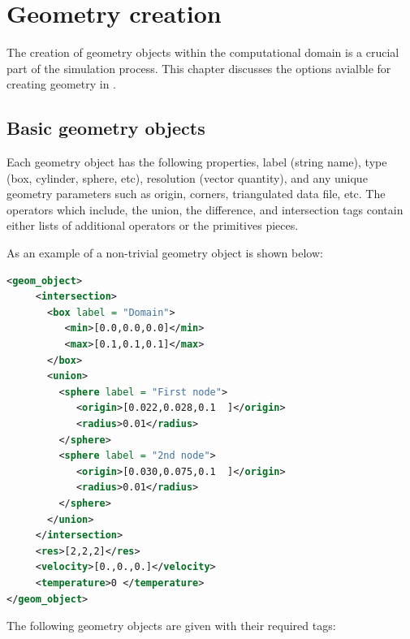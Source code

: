 \chapter{Geometry creation}\label{chap:GeometryCreation}
The creation of geometry objects within the computational domain is
a crucial part of the simulation process.  This chapter discusses the
options avialble for creating geometry in \Vaango.

\section{Basic geometry objects} \label{Sec:GeometryObjects}

Each geometry object has the following properties, label (string
name), type (box, cylinder, sphere, etc), resolution (vector
quantity), and any unique geometry parameters such as origin, corners,
triangulated data file, etc.  The operators which include, the union,
the difference, and intersection tags contain either lists of
additional operators or the primitives pieces.

As an example of a non-trivial geometry object is shown below:

\begin{lstlisting}[language=XML]
<geom_object>
     <intersection>
       <box label = "Domain">
          <min>[0.0,0.0,0.0]</min>
          <max>[0.1,0.1,0.1]</max>
       </box>
       <union>
         <sphere label = "First node">
            <origin>[0.022,0.028,0.1  ]</origin>
            <radius>0.01</radius>
         </sphere>
         <sphere label = "2nd node">
            <origin>[0.030,0.075,0.1  ]</origin>
            <radius>0.01</radius>
         </sphere>
       </union>
     </intersection>
     <res>[2,2,2]</res>
     <velocity>[0.,0.,0.]</velocity>
     <temperature>0 </temperature>
</geom_object>
\end{lstlisting}

The following geometry objects are given with their required tags:

